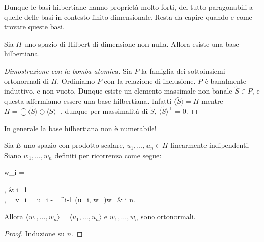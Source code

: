 Dunque le basi hilbertiane hanno proprietà molto forti, del tutto paragonabili a quelle delle basi in contesto finito-dimensionale. Resta da capire quando e come trovare queste basi.

\begin{theorem}
\label{th:hilb_basis}
	Sia $H$ uno spazio di Hilbert di dimensione non nulla.
	Allora esiste una base hilbertiana.
\end{theorem}
\begin{proof}[Dimostrazione con la bomba atomica]
	Sia $P$ la famiglia dei sottoinsiemi ortonormali di $H$. Ordiniamo $P$ con la relazione di inclusione. $P$ è banalmente induttivo, e non vuoto. Dunque esiste un elemento massimale non banale $\tilde S \in P$, e questa affermiamo essere una base hilbertiana. Infatti $\langle \tilde S \rangle = H$ mentre $H = \closure {\langle \tilde S \rangle} \oplus \langle \tilde S \rangle^\perp$, dunque per massimalità di $\tilde S$, $\langle \tilde S \rangle^\perp = 0$.
\end{proof}

\begin{remark}
	In generale la base hilbertiana non è numerabile!
\end{remark}

\begin{lemma}
	Sia $E$ uno spazio con prodotto scalare, $u_1, \ldots, u_n \in H$ linearmente indipendenti. Siano $w_1, \ldots, w_n$ definiti per ricorrenza come segue:
	\begin{eqalign*}
		w_i = \begin{dcases}
			, & i=1\\
			, \ \ v_i = u_i - \sum_{}^{i-1} (u_i, w_\ell)w_\ell & i  \leq n.
		\end{dcases}
	\end{eqalign*}
	Allora $\langle w_1, \ldots, w_n \rangle = \langle u_1, \ldots, u_n \rangle$ e $w_1, \ldots, w_n$ sono ortonormali.
\end{lemma}
\begin{proof}
	Induzione su $n$.
\end{proof}

